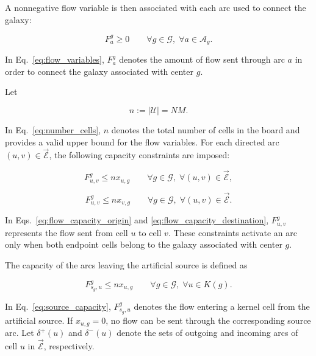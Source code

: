 A nonnegative flow variable is then associated with each arc used to connect the galaxy:

\begin{equation}
F^g_a \geq 0
\qquad
\forall g \in \mathcal{G}, \; \forall a \in \mathcal{A}_g.
\label{eq:flow_variables}
\end{equation}

In Eq.~\ref{eq:flow_variables}, \(F^g_a\) denotes the amount of flow sent through arc \(a\) in order to connect the galaxy associated with center \(g\).

Let

\begin{equation}
n := |\mathcal{U}| = NM.
\label{eq:number_cells}
\end{equation}

In Eq.~\ref{eq:number_cells}, \(n\) denotes the total number of cells in the board and provides a valid upper bound for the flow variables. For each directed arc \((u,v)\in\overrightarrow{\mathcal{E}}\), the following capacity constraints are imposed:

\begin{equation}
F^g_{u,v} \leq n x_{u,g}
\qquad
\forall g \in \mathcal{G}, \; \forall (u,v)\in\overrightarrow{\mathcal{E}},
\label{eq:flow_capacity_origin}
\end{equation}

\begin{equation}
F^g_{u,v} \leq n x_{v,g}
\qquad
\forall g \in \mathcal{G}, \; \forall (u,v)\in\overrightarrow{\mathcal{E}}.
\label{eq:flow_capacity_destination}
\end{equation}

In Eqs.~\ref{eq:flow_capacity_origin} and \ref{eq:flow_capacity_destination}, \(F^g_{u,v}\) represents the flow sent from cell \(u\) to cell \(v\). These constraints activate an arc only when both endpoint cells belong to the galaxy associated with center \(g\).

The capacity of the arcs leaving the artificial source is defined as

\begin{equation}
F^g_{s_g,u} \leq n x_{u,g}
\qquad
\forall g \in \mathcal{G}, \; \forall u \in K(g).
\label{eq:source_capacity}
\end{equation}

In Eq.~\ref{eq:source_capacity}, \(F^g_{s_g,u}\) denotes the flow entering a kernel cell from the artificial source. If \(x_{u,g}=0\), no flow can be sent through the corresponding source arc. Let \(\delta^+(u)\) and \(\delta^-(u)\) denote the sets of outgoing and incoming arcs of cell \(u\) in \(\overrightarrow{\mathcal{E}}\), respectively.

